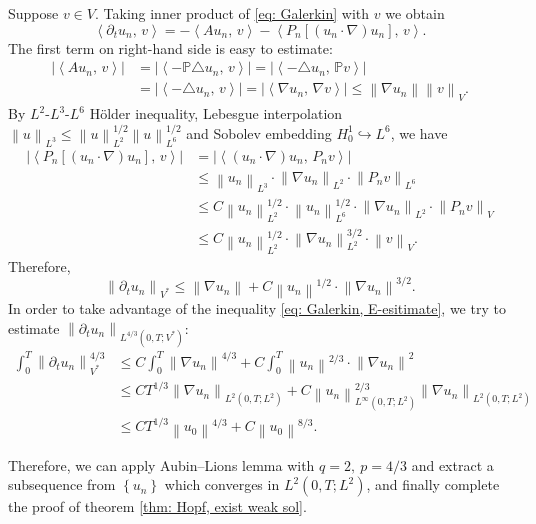 \documentclass[a4paper, 12pt, oneside]{amsart}
\theoremstyle{definition}
\theoremstyle{remark}
\newcommand{\abs}[1]{\left\lvert #1 \right\rvert}
\newcommand{\norm}[1]{\left\lVert #1 \right\rVert}
\newcommand{\bk}[2]{\left\langle #1,\, #2 \right\rangle}
\newcommand{\set}[1]{\left\{ #1 \right\}}
\renewcommand{\leq}{\leqslant}
\newcommand{\p}{\partial}
\newcommand{\mb}[1]{\mathbb{#1}}
\newcommand{\laplace}{\triangle}
\begin{document}
Suppose $v\in V$. Taking inner product of \eqref{eq: Galerkin} with $v$ we obtain
\[
    \bk{\p_t u_n}{v} = - \bk{Au_n}{v} - \bk{P_n[(u_n\cdot\nabla)u_n]}{v}.
\]
The first term on right-hand side is easy to estimate:
\begin{align*}
    \abs{\bk{Au_n}{v}} &= \abs{\bk{-\mb{P}\laplace u_n}{v}} = \abs{\bk{-\laplace u_n}{\mb{P}v}} \\
    &= \abs{\bk{-\laplace u_n}{v}} = \abs{\bk{\nabla u_n}{\nabla v}}\leq\norm{\nabla u_n}\norm{v}_V.
\end{align*}
By $L^2$-$L^3$-$L^6$ H\"older inequality, Lebesgue interpolation $\norm{u}_{L^3}\leq\norm{u}_{L^2}^{1/2}\norm{u}_{L^6}^{1/2}$ and Sobolev embedding $H_0^1\hookrightarrow L^6$, we have
\begin{align*}
    \abs{\bk{P_n[(u_n\cdot\nabla)u_n]}{v}} &= \abs{\bk{(u_n\cdot\nabla)u_n}{P_nv}}\\
    &\leq\norm{u_n}_{L^3}\cdot\norm{\nabla u_n}_{L^2}\cdot\norm{P_nv}_{L^6}\\
    &\leq C\norm{u_n}_{L^2}^{1/2}\cdot\norm{u_n}_{L^6}^{1/2}\cdot\norm{\nabla u_n}_{L^2}\cdot\norm{P_nv}_V\\
    &\leq C\norm{u_n}_{L^2}^{1/2}\cdot\norm{\nabla u_n}_{L^2}^{3/2}\cdot\norm{v}_V.
\end{align*}
Therefore,
\[
    \norm{\p_t u_n}_{V^*}\leq\norm{\nabla u_n} + C\norm{u_n}^{1/2}\cdot\norm{\nabla u_n}^{3/2}.
\]
In order to take advantage of the inequality \eqref{eq: Galerkin, E-esitimate}, we try to estimate $\norm{\p_t u_n}_{L^{4/3}(0, T; V^*)}$:
\begin{align*}
    \int_0^T \norm{\p_t u_n}_{V^*}^{4/3}&\leq C\int_0^T\norm{\nabla u_n}^{4/3} + C\int_0^T\norm{u_n}^{2/3}\cdot\norm{\nabla u_n}^{2}\\
    &\leq CT^{1/3}\norm{\nabla u_n}_{L^2(0, T; L^2)} + C\norm{u_n}_{L^\infty(0, T; L^2)}^{2/3}\norm{\nabla u_n}_{L^2(0, T; L^2)}\\
    &\leq CT^{1/3}\norm{u_0}^{4/3} + C\norm{u_0}^{8/3}.
\end{align*}

Therefore, we can apply Aubin--Lions lemma with $q=2,\ p=4/3$ and extract a subsequence from $\set{u_n}$ which converges in $L^2(0, T; L^2)$, and finally complete the proof of theorem \ref{thm: Hopf, exist weak sol}.



\end{document}
